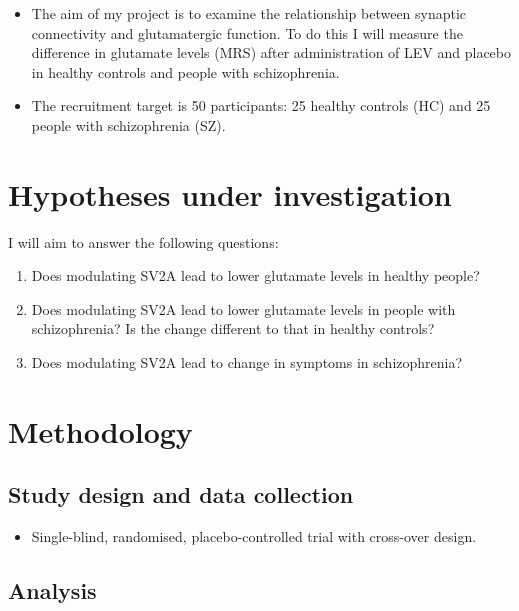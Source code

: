 \documentclass[
  letterpaper,
  DIV=11,
  numbers=noendperiod]{scrartcl}
\providecommand{\tightlist}{%
  \setlength{\itemsep}{0pt}\setlength{\parskip}{0pt}}\usepackage{longtable,booktabs,array}
\begin{document}
\begin{itemize}
\tightlist
\item
  The aim of my project is to examine the relationship between synaptic
  connectivity and glutamatergic function. To do this I will measure the
  difference in glutamate levels (MRS) after administration of LEV and
  placebo in healthy controls and people with schizophrenia.
\item
  The recruitment target is 50 participants: 25 healthy controls (HC)
  and 25 people with schizophrenia (SZ).
\end{itemize}

\section{Hypotheses under
investigation}\label{hypotheses-under-investigation}

I will aim to answer the following questions:

\begin{enumerate}
\def\labelenumi{\arabic{enumi}.}
\tightlist
\item
  Does modulating SV2A lead to lower glutamate levels in healthy people?
\item
  Does modulating SV2A lead to lower glutamate levels in people with
  schizophrenia? Is the change different to that in healthy controls?
\item
  Does modulating SV2A lead to change in symptoms in schizophrenia?
\end{enumerate}

\section{Methodology}\label{methodology}

\subsection{Study design and data
collection}\label{study-design-and-data-collection}

\begin{itemize}
\tightlist
\item
  Single-blind, randomised, placebo-controlled trial with cross-over
  design.
\end{itemize}

\subsection{Analysis}\label{analysis}
\end{document}
